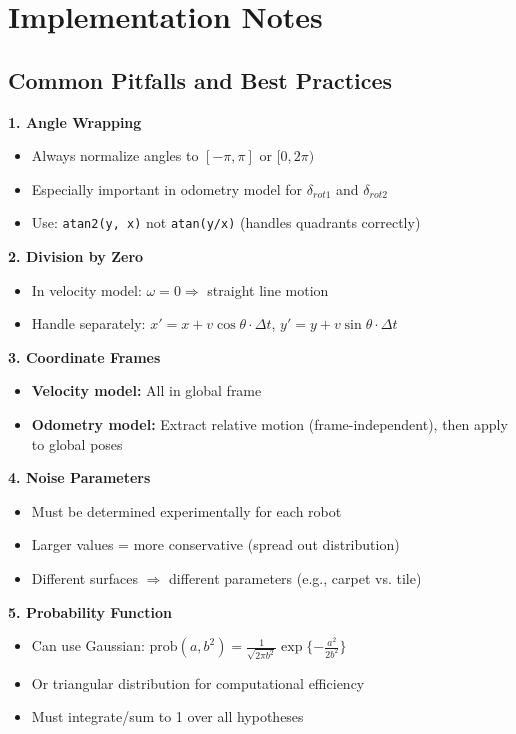 \section{Implementation Notes}

\subsection{Common Pitfalls and Best Practices}

\begin{tcolorbox}[colback=red!5!white,colframe=red!75!black,title=\textbf{EXAM CRITICAL: Implementation Issues}]

\textbf{1. Angle Wrapping}
\begin{itemize}
    \item Always normalize angles to $[-\pi, \pi]$ or $[0, 2\pi)$
    \item Especially important in odometry model for $\delta_{rot1}$ and $\delta_{rot2}$
    \item Use: \texttt{atan2(y, x)} not \texttt{atan(y/x)} (handles quadrants correctly)
\end{itemize}

\textbf{2. Division by Zero}
\begin{itemize}
    \item In velocity model: $\omega = 0 \Rightarrow$ straight line motion
    \item Handle separately: $x' = x + v\cos\theta \cdot \Delta t$, $y' = y + v\sin\theta \cdot \Delta t$
\end{itemize}

\textbf{3. Coordinate Frames}
\begin{itemize}
    \item \textbf{Velocity model:} All in global frame
    \item \textbf{Odometry model:} Extract relative motion (frame-independent), then apply to global poses
\end{itemize}

\textbf{4. Noise Parameters}
\begin{itemize}
    \item Must be determined experimentally for each robot
    \item Larger values = more conservative (spread out distribution)
    \item Different surfaces $\Rightarrow$ different parameters (e.g., carpet vs. tile)
\end{itemize}

\textbf{5. Probability Function}
\begin{itemize}
    \item Can use Gaussian: $\text{prob}(a, b^2) = \frac{1}{\sqrt{2\pi b^2}}\exp\{-\frac{a^2}{2b^2}\}$
    \item Or triangular distribution for computational efficiency
    \item Must integrate/sum to 1 over all hypotheses
\end{itemize}

\end{tcolorbox}

